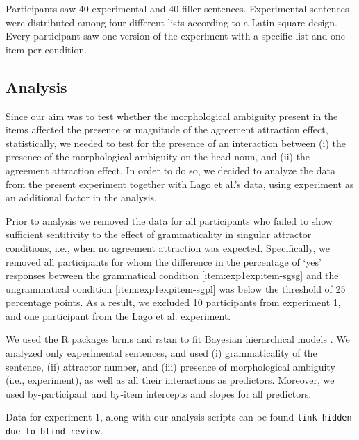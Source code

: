 \documentclass[doc,a4paper,man,natbib,floatsintext,noextraspace]{apa6}\usepackage[]{graphicx}\usepackage[]{color}
\begin{document}
Participants saw 40 experimental and 40 filler sentences. Experimental sentences were distributed among four different lists according to a Latin-square design. Every participant saw one version of the experiment with a specific list and one item per condition.   

\subsection{Analysis} \label{sec:exp1:analysis}

Since our aim was to test whether the morphological ambiguity present in the \citet{LagoEtAl:2018} items affected the presence or magnitude of the agreement attraction effect, statistically, we needed to test for the presence of an interaction between (i) the presence of the morphological ambiguity on the head noun, and (ii) the agreement attraction effect. In order to do so, we decided to analyze the data from the present experiment together with Lago et al.'s data, using experiment as an additional factor in the analysis.


Prior to analysis we removed the data for all participants who failed to show sufficient sentitivity to the effect of grammaticality in singular attractor conditions, i.e., when no agreement attraction was expected. Specifically, we removed all participants for whom the difference in the percentage of `yes' responses between the grammatical condition \ref{item:exp1expitem-sgsg} and the ungrammatical condition \ref{item:exp1expitem-sgpl} was below the threshold of 25 percentage points. As a result, we excluded 10 participants from experiment 1, and  one participant from the Lago et al. experiment.

We used the R packages brms \citep{R-brms_b} and rstan \citep{R-stan} to fit Bayesian hierarchical models \citep[e.g.,]{GelmanHill:2007}. We analyzed only experimental sentences, and used (i) grammaticality of the sentence, (ii) attractor number, and (iii) presence of morphological ambiguity (i.e., experiment), as well as all their interactions as predictors. Moreover, we used by-participant and by-item intercepts and slopes for all predictors.

Data for experiment 1, along with our analysis scripts can be found \texttt{link hidden due to blind review}.
\end{document}
